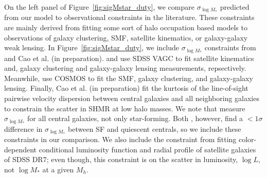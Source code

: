 \documentclass[12pt, letterpaper, preprint, tighten]{aastex62}
\begin{document}
On the left panel of Figure~\ref{fig:sigMstar_duty}, we compare 
$\sigma_{\log M_*}$ predicted from our model to observational 
constraints in the literature. These constraints are mainly derived from 
fitting some sort of halo occupation based models to observations of galaxy 
clustering, SMF, satellite kinematics, or galaxy-galaxy weak lensing. In 
Figure~\ref{fig:sigMstar_duty}, we include $\sigma_{\log M_*}$ constraints 
from~\cite{more2011, leauthaud2012, tinker2013, zu2015} and 
Cao et al. (in preparation). \cite{more2011} and \cite{zu2015} use SDSS 
VAGC to fit satellite kinematics and, galaxy clustering and galaxy-galaxy 
lensing measurements, repsectively. Meanwhile, \cite{leauthaud2012, tinker2013} 
use COSMOS to fit the SMF, galaxy clustering, and galaxy-galaxy lensing. 
Finally, Cao et al. (in preparation) fit the kurtosis of the line-of-sight 
pairwise velocity dispersion between central galaxies and all neighboring 
galaxies to constrain the scatter in SHMR at low halo masses. We note that 
\cite{leauthaud2012, zu2015} measure $\sigma_{\log M_*}$ for all central 
galaxies, not only star-forming. Both \cite{more2011, tinker2013}, however, 
find a $< 1\sigma$ difference in $\sigma_{\log M_*}$ between SF and quiescent 
centrals, so we include these constraints in our comparison. We also include 
the \cite{lange2018a} constraint from fitting color-dependent conditional 
luminosity function and radial profile of satellite galaxies of SDSS DR7; 
even though, this constraint is on the scatter in luminosity, $\log L$, 
not $\log M_*$ at a given $M_h$. 
\end{document}

